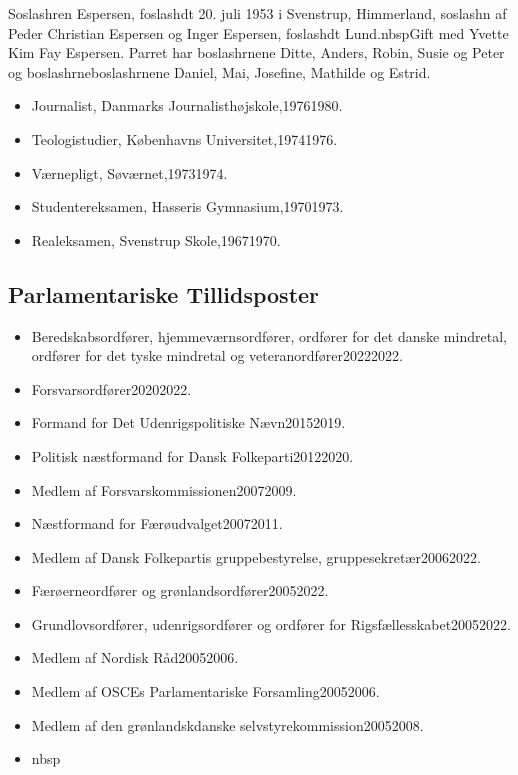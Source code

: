 \documentclass[11pt, a4paper]{awesome-cv}
\begin{document}
\makecvheader[R]
\makelettertitle
\begin{cvletter}
Soslashren Espersen, foslashdt 20. juli 1953 i Svenstrup, Himmerland, soslashn af Peder Christian Espersen og Inger Espersen, foslashdt Lund.nbspGift med Yvette Kim Fay Espersen. Parret har boslashrnene Ditte, Anders, Robin, Susie og Peter og boslashrneboslashrnene Daniel, Mai, Josefine, Mathilde og Estrid.



\begin{itemize}
\item Journalist, Danmarks Journalisthøjskole,19761980.
\item Teologistudier, Københavns Universitet,19741976.
\item Værnepligt, Søværnet,19731974.
\item Studentereksamen, Hasseris Gymnasium,19701973.
\item Realeksamen, Svenstrup Skole,19671970.
\end{itemize}
\subsection*{Parlamentariske Tillidsposter}
\begin{itemize}
\item Beredskabsordfører, hjemmeværnsordfører, ordfører for det danske mindretal, ordfører for det tyske mindretal og veteranordfører20222022.
\item Forsvarsordfører20202022.
\item Formand for Det Udenrigspolitiske Nævn20152019.
\item Politisk næstformand for Dansk Folkeparti20122020.
\item Medlem af Forsvarskommissionen20072009.
\item Næstformand for Færøudvalget20072011.
\item Medlem af Dansk Folkepartis gruppebestyrelse, gruppesekretær20062022.
\item Færøerneordfører og grønlandsordfører20052022.
\item Grundlovsordfører, udenrigsordfører og ordfører for Rigsfællesskabet20052022.
\item Medlem af Nordisk Råd20052006.
\item Medlem af OSCEs Parlamentariske Forsamling20052006.
\item Medlem af den grønlandskdanske selvstyrekommission20052008.
\item nbsp
\end{itemize}

\end{cvletter}
\end{document}
